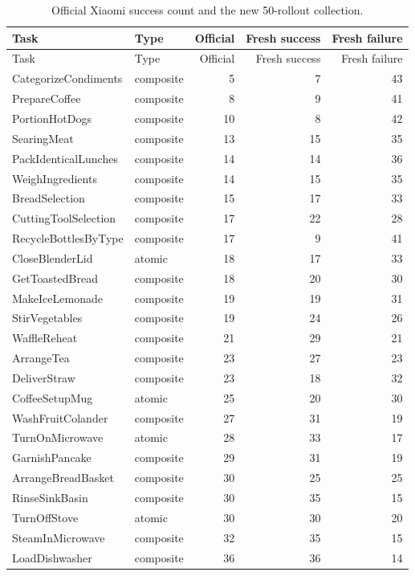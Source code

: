 \documentclass[11pt,a4paper]{article}
\begin{document}
\begin{longtable}{p{}p{}rrr}
\caption{Official Xiaomi success count and the new 50-rollout collection.}
\label{tab:xr1-official-collection}\\
\toprule
Task & Type & Official & Fresh success & Fresh failure\\
\midrule
\endfirsthead
\toprule
Task & Type & Official & Fresh success & Fresh failure\\
\midrule
\endhead
CategorizeCondiments & composite & 5 & 7 & 43\\
PrepareCoffee & composite & 8 & 9 & 41\\
PortionHotDogs & composite & 10 & 8 & 42\\
SearingMeat & composite & 13 & 15 & 35\\
PackIdenticalLunches & composite & 14 & 14 & 36\\
WeighIngredients & composite & 14 & 15 & 35\\
BreadSelection & composite & 15 & 17 & 33\\
CuttingToolSelection & composite & 17 & 22 & 28\\
RecycleBottlesByType & composite & 17 & 9 & 41\\
CloseBlenderLid & atomic & 18 & 17 & 33\\
GetToastedBread & composite & 18 & 20 & 30\\
MakeIceLemonade & composite & 19 & 19 & 31\\
StirVegetables & composite & 19 & 24 & 26\\
WaffleReheat & composite & 21 & 29 & 21\\
ArrangeTea & composite & 23 & 27 & 23\\
DeliverStraw & composite & 23 & 18 & 32\\
CoffeeSetupMug & atomic & 25 & 20 & 30\\
WashFruitColander & composite & 27 & 31 & 19\\
TurnOnMicrowave & atomic & 28 & 33 & 17\\
GarnishPancake & composite & 29 & 31 & 19\\
ArrangeBreadBasket & composite & 30 & 25 & 25\\
RinseSinkBasin & composite & 30 & 35 & 15\\
TurnOffStove & atomic & 30 & 30 & 20\\
SteamInMicrowave & composite & 32 & 35 & 15\\
LoadDishwasher & composite & 36 & 36 & 14\\

\end{longtable}
\end{document}

